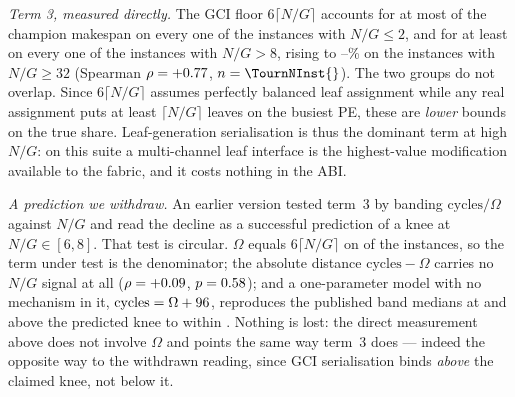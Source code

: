 \documentclass[journal,10pt]{IEEEtran}
\theoremstyle{plain}
\theoremstyle{definition}
\theoremstyle{remark}
\begin{document}
\emph{Term 3, measured directly.} The GCI floor $6\lceil N/G\rceil$ accounts
for at most \GciShareLowMax{} of the champion makespan on every one of the
\GciLowInst{} instances with $N/G \le 2$, and for at least \GciShareHighMin{}
on every one of the \GciHighInst{} instances with $N/G > 8$, rising to
\GciShareTopLo{}--\GciShareTopHi{}\% on the \GciTopInst{} instances with
$N/G \ge 32$ (Spearman $\rho = +0.77{}$, $n = \TournNInst{}$). The two
groups do not overlap. Since $6\lceil N/G\rceil$ assumes perfectly balanced
leaf assignment while any real assignment puts at least $\lceil N/G\rceil$
leaves on the busiest PE, these are \emph{lower} bounds on the true share.
Leaf-generation serialisation is thus the dominant term at high $N/G$: on this
suite a multi-channel leaf interface is the highest-value modification
available to the fabric, and it costs nothing in the ABI.

\emph{A prediction we withdraw.} An earlier version tested term~3 by banding
$\mathrm{cycles}/\Omega$ against $N/G$ and read the decline as a successful
prediction of a knee at $N/G \in [6,8]$. That test is circular. $\Omega$
equals $6\lceil N/G\rceil$ on \GciOmegaEq{} of the \TournNInst{} instances, so
the term under test is the denominator; the absolute distance
$\mathrm{cycles}-\Omega$ carries no $N/G$ signal at all
($\rho = +0.09{}$, $p = 0.58{}$); and a one-parameter model with no
mechanism in it, $\mathrm{cycles} = \Omega + 96{}$, reproduces the
published band medians at and above the predicted knee to within
\GciNullTol{}. Nothing is lost: the direct measurement above does not involve
$\Omega$ and points the same way term~3 does --- indeed the opposite way to
the withdrawn reading, since GCI serialisation binds \emph{above} the claimed
knee, not below it.


\end{document}
